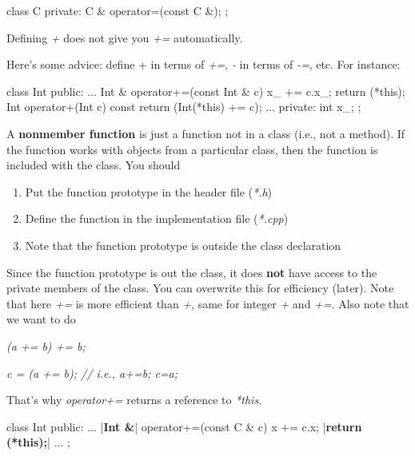 \begin{consolethree}[escapeinside=||]
class C
{
private:
    C & operator=(const C &);
};
\end{consolethree}


\newpage{}

Defining \textit{+} does not give you \textit{+=} automatically.

Here's some advice: define + in terms of \textit{+=},
\textit{-} in terms of \textit{-=}, etc. For instance:

\begin{consolethree}[escapeinside=||]
class Int
{
public:
    ...
    Int & operator+=(const Int & c)
    {
        x_ += c.x_;
        return (*this);
    }
    Int operator+(Int c) const
    {
        return (Int(*this) += c);
    }
    ...
private:
    int x_;
};
\end{consolethree}

A \textbf{nonmember function} is just a function not in a class (i.e.,
not a method). If the function works with objects from a particular
class, then the function is included with the class. You should

\begin{enumerate}
\item Put the function prototype in the header file (\textit{*.h})
\item Define the function in the implementation file (\textit{*.cpp})
\item Note that the function prototype is outside the class declaration
\end{enumerate}

Since the function prototype is out the class, it does \textbf{not} have
access to the private members of the class. You can overwrite this for
efficiency (later). Note that here \textit{+=} is more efficient than \textit{+}, same
for integer \textit{+} and \textit{+=}. Also note that we want to do

\textit{(a += b) += b;}

\textit{c = (a += b); // i.e., a+=b; c=a;}

That's why \textit{operator+=} returns a reference to
\textit{*this}.

\begin{consolethree}[escapeinside=||]
class Int
{
public:
    ...
    |{\bf Int \&}| operator+=(const C & c)
    {
        x += c.x;
        |{\bf return (*this);}|
    }
    ...
};
\end{consolethree}

